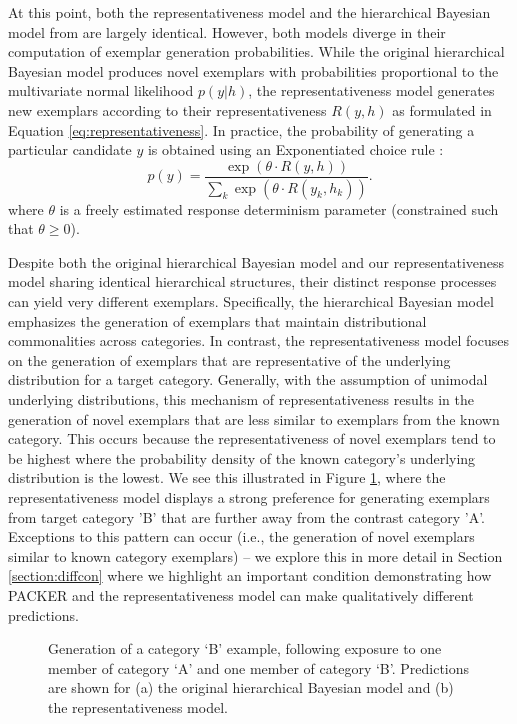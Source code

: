\documentclass[12pt]{article}
\newcommand\inputpgf[2]{{
\let\pgfimageWithoutPath\pgfimage
\renewcommand{\pgfimage}[2][]{\pgfimageWithoutPath[##1]{#1/##2}}

}}
\begin{document}
\begin{flushleft}
At this point, both the representativeness model and the hierarchical Bayesian
model from \cite{jern2013probabilistic} are largely identical. However, both
models diverge in their computation of exemplar generation probabilities. While
the original hierarchical Bayesian model produces novel exemplars with
probabilities proportional to the multivariate normal likelihood $p(y|h)$, the
representativeness model generates new exemplars according to their representativeness $R(y,h)$ as formulated in Equation \ref{eq:representativeness}. In practice, the probability of generating a
particular candidate $y$ is obtained using an Exponentiated
choice rule \citep{luce1977choice}:
\begin{equation}
  p(y) = \dfrac
    {\exp( \theta \cdot R(y,h))}
    {\sum_k \exp(\theta  \cdot R(y_k,h_k))} .
\label{eq:representative-choice}
\end{equation}
where $\theta$ is a freely estimated response determinism parameter (constrained
such that $\theta \geq 0$).

Despite both the original hierarchical Bayesian model and our representativeness
model sharing identical hierarchical structures, their distinct response
processes can yield very different exemplars. Specifically, the hierarchical
Bayesian model emphasizes the generation of exemplars that maintain
distributional commonalities across categories. In contrast, the
representativeness model focuses on the generation of exemplars that are
representative of the underlying distribution for a target category. Generally,
with the assumption of unimodal underlying distributions, this mechanism of
representativeness results in the generation of novel exemplars that are less
similar to exemplars from the known category. This occurs because the
representativeness of novel exemplars tend to be highest where the probability
density of the known category's underlying distribution is the lowest. We see
this illustrated in Figure \ref{fig:representative-examples}, where the
representativeness model displays a strong preference for generating exemplars
from target category 'B' that are further away from the contrast category 'A'.
Exceptions to this pattern can occur (i.e., the generation of novel exemplars
similar to known category exemplars) -- we explore this in more detail in Section
\ref{section:diffcon} where we highlight an important condition demonstrating
how PACKER and the representativeness model can make qualitatively different
predictions.

\begin{figure}
	\begin{center} \inputpgf{figs/}{hbm-examples.pgf}
		\caption{Generation of a category `B' example, following exposure
to one member of category `A' and one member of category `B'. Predictions are
shown for (a) the original hierarchical Bayesian model and (b) the
representativeness model.}
		\label{fig:representative-examples}
	\end{center}
\end{figure}


\end{flushleft}
\end{document}
